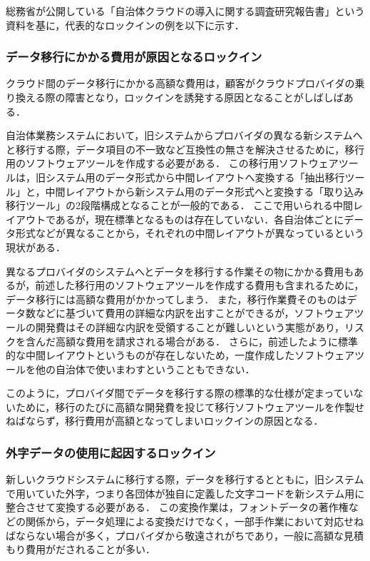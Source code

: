 総務省が公開している「自治体クラウドの導入に関する調査研究報告書」という資料\cite{soumu}を基に，代表的なロックインの例を以下に示す．

\subsubsection{データ移行にかかる費用が原因となるロックイン}

クラウド間のデータ移行にかかる高額な費用は，顧客がクラウドプロバイダの乗り換える際の障害となり，ロックインを誘発する原因となることがしばしばある．

自治体業務システムにおいて，旧システムからプロバイダの異なる新システムへと移行する際，データ項目の不一致など互換性の無さを解決させるために，移行用のソフトウェアツールを作成する必要がある．
この移行用ソフトウェアツールは，旧システム用のデータ形式から中間レイアウトへ変換する「抽出移行ツール」と，中間レイアウトから新システム用のデータ形式へと変換する「取り込み移行ツール」の2段階構成となることが一般的である．
ここで用いられる中間レイアウトであるが，現在標準となるものは存在していない．各自治体ごとにデータ形式などが異なることから，それぞれの中間レイアウトが異なっているという現状がある．

異なるプロバイダのシステムへとデータを移行する作業その物にかかる費用もあるが，前述した移行用のソフトウェアツールを作成する費用も含まれるために，データ移行には高額な費用がかかってしまう．
また，移行作業費そのものはデータ数などに基づいて費用の詳細な内訳を出すことができるが，ソフトウェアツールの開発費はその詳細な内訳を受領することが難しいという実態があり，リスクを含んだ高額な費用を請求される場合がある．
さらに，前述したように標準的な中間レイアウトというものが存在しないため，一度作成したソフトウェアツールを他の自治体で使いまわすということもできない．

このように，プロバイダ間でデータを移行する際の標準的な仕様が定まっていないために，移行のたびに高額な開発費を投じて移行ソフトウェアツールを作製せねばならず，移行費用が高額となってしまいロックインの原因となる．

\subsubsection{外字データの使用に起因するロックイン}

新しいクラウドシステムに移行する際，データを移行するとともに，旧システムで用いていた外字，つまり各団体が独自に定義した文字コードを新システム用に整合させて変換する必要がある．
この変換作業は，フォントデータの著作権などの関係から，データ処理による変換だけでなく，一部手作業において対応せねばならない場合が多く，プロバイダから敬遠されがちであり，一般に高額な見積もり費用がだされることが多い．


